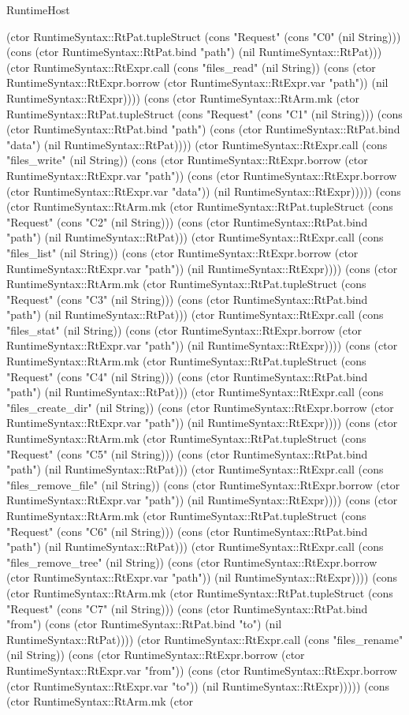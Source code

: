 \begin{lexlean}{RuntimeHost}
\begin{semanticmodule}
{(ctor RuntimeSyntax::RtPat.tupleStruct (cons "Request" (cons "C0" (nil String))) (cons (ctor RuntimeSyntax::RtPat.bind "path") (nil RuntimeSyntax::RtPat))) (ctor RuntimeSyntax::RtExpr.call (cons "files_read" (nil String)) (cons (ctor RuntimeSyntax::RtExpr.borrow (ctor RuntimeSyntax::RtExpr.var "path")) (nil RuntimeSyntax::RtExpr)))) (cons (ctor RuntimeSyntax::RtArm.mk (ctor RuntimeSyntax::RtPat.tupleStruct (cons "Request" (cons "C1" (nil String))) (cons (ctor RuntimeSyntax::RtPat.bind "path") (cons (ctor RuntimeSyntax::RtPat.bind "data") (nil RuntimeSyntax::RtPat)))) (ctor RuntimeSyntax::RtExpr.call (cons "files_write" (nil String)) (cons (ctor RuntimeSyntax::RtExpr.borrow (ctor RuntimeSyntax::RtExpr.var "path")) (cons (ctor RuntimeSyntax::RtExpr.borrow (ctor RuntimeSyntax::RtExpr.var "data")) (nil RuntimeSyntax::RtExpr))))) (cons (ctor RuntimeSyntax::RtArm.mk (ctor RuntimeSyntax::RtPat.tupleStruct (cons "Request" (cons "C2" (nil String))) (cons (ctor RuntimeSyntax::RtPat.bind "path") (nil RuntimeSyntax::RtPat))) (ctor RuntimeSyntax::RtExpr.call (cons "files_list" (nil String)) (cons (ctor RuntimeSyntax::RtExpr.borrow (ctor RuntimeSyntax::RtExpr.var "path")) (nil RuntimeSyntax::RtExpr)))) (cons (ctor RuntimeSyntax::RtArm.mk (ctor RuntimeSyntax::RtPat.tupleStruct (cons "Request" (cons "C3" (nil String))) (cons (ctor RuntimeSyntax::RtPat.bind "path") (nil RuntimeSyntax::RtPat))) (ctor RuntimeSyntax::RtExpr.call (cons "files_stat" (nil String)) (cons (ctor RuntimeSyntax::RtExpr.borrow (ctor RuntimeSyntax::RtExpr.var "path")) (nil RuntimeSyntax::RtExpr)))) (cons (ctor RuntimeSyntax::RtArm.mk (ctor RuntimeSyntax::RtPat.tupleStruct (cons "Request" (cons "C4" (nil String))) (cons (ctor RuntimeSyntax::RtPat.bind "path") (nil RuntimeSyntax::RtPat))) (ctor RuntimeSyntax::RtExpr.call (cons "files_create_dir" (nil String)) (cons (ctor RuntimeSyntax::RtExpr.borrow (ctor RuntimeSyntax::RtExpr.var "path")) (nil RuntimeSyntax::RtExpr)))) (cons (ctor RuntimeSyntax::RtArm.mk (ctor RuntimeSyntax::RtPat.tupleStruct (cons "Request" (cons "C5" (nil String))) (cons (ctor RuntimeSyntax::RtPat.bind "path") (nil RuntimeSyntax::RtPat))) (ctor RuntimeSyntax::RtExpr.call (cons "files_remove_file" (nil String)) (cons (ctor RuntimeSyntax::RtExpr.borrow (ctor RuntimeSyntax::RtExpr.var "path")) (nil RuntimeSyntax::RtExpr)))) (cons (ctor RuntimeSyntax::RtArm.mk (ctor RuntimeSyntax::RtPat.tupleStruct (cons "Request" (cons "C6" (nil String))) (cons (ctor RuntimeSyntax::RtPat.bind "path") (nil RuntimeSyntax::RtPat))) (ctor RuntimeSyntax::RtExpr.call (cons "files_remove_tree" (nil String)) (cons (ctor RuntimeSyntax::RtExpr.borrow (ctor RuntimeSyntax::RtExpr.var "path")) (nil RuntimeSyntax::RtExpr)))) (cons (ctor RuntimeSyntax::RtArm.mk (ctor RuntimeSyntax::RtPat.tupleStruct (cons "Request" (cons "C7" (nil String))) (cons (ctor RuntimeSyntax::RtPat.bind "from") (cons (ctor RuntimeSyntax::RtPat.bind "to") (nil RuntimeSyntax::RtPat)))) (ctor RuntimeSyntax::RtExpr.call (cons "files_rename" (nil String)) (cons (ctor RuntimeSyntax::RtExpr.borrow (ctor RuntimeSyntax::RtExpr.var "from")) (cons (ctor RuntimeSyntax::RtExpr.borrow (ctor RuntimeSyntax::RtExpr.var "to")) (nil RuntimeSyntax::RtExpr))))) (cons (ctor RuntimeSyntax::RtArm.mk (ctor }
\end{semanticmodule}
\end{lexlean}
